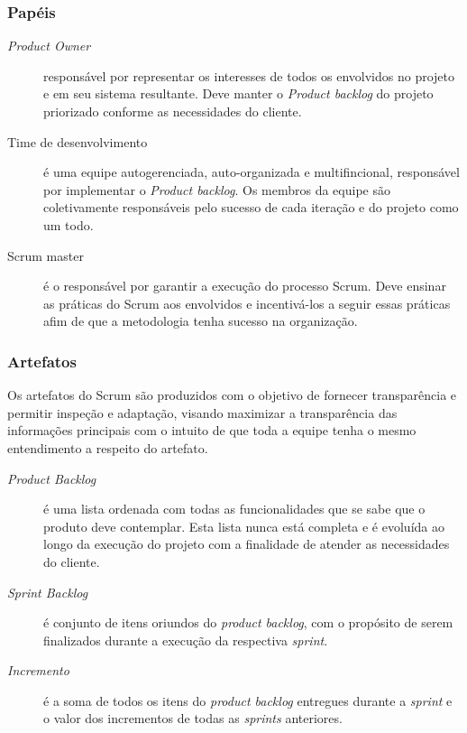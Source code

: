 \subsubsection{Papéis}

\begin{description}
    \item[\textit{Product Owner}] responsável por representar os interesses de
    todos os envolvidos no projeto e em seu sistema resultante. Deve manter o
    \textit{Product backlog} do projeto priorizado conforme as necessidades do cliente.
    \item[Time de desenvolvimento] é uma equipe autogerenciada, auto-organizada e
    multifincional, responsável por implementar o \textit{Product backlog}. Os
    membros da equipe são coletivamente responsáveis pelo sucesso de cada iteração
    e do projeto como um todo.
    \item[Scrum master] é o responsável por garantir a execução do processo Scrum.
    Deve ensinar as práticas do Scrum aos envolvidos e incentivá-los a seguir essas
    práticas afim de que a metodologia tenha sucesso na organização.
\end{description}

\subsubsection{Artefatos}

Os artefatos do Scrum são produzidos com o objetivo de fornecer transparência e
permitir inspeção e adaptação, visando maximizar a transparência das informações
principais com o intuito de que toda a equipe tenha o mesmo entendimento a respeito
do artefato.

\begin{description}
    \item[\textit{Product Backlog}] é uma lista ordenada com todas as funcionalidades
    que se sabe que o produto deve contemplar. Esta lista nunca está completa e é
    evoluída ao longo da execução do projeto com a finalidade de atender as necessidades
    do cliente.
    \item[\textit{Sprint Backlog}] é conjunto de itens oriundos do \textit{product backlog},
    com o propósito de serem finalizados durante a execução da respectiva \textit{sprint}.
    \item[\textit{Incremento}] é a soma de todos os itens do \textit{product backlog}
    entregues durante a \textit{sprint} e o valor dos incrementos de todas as \textit{sprints}
    anteriores.
\end{description}

